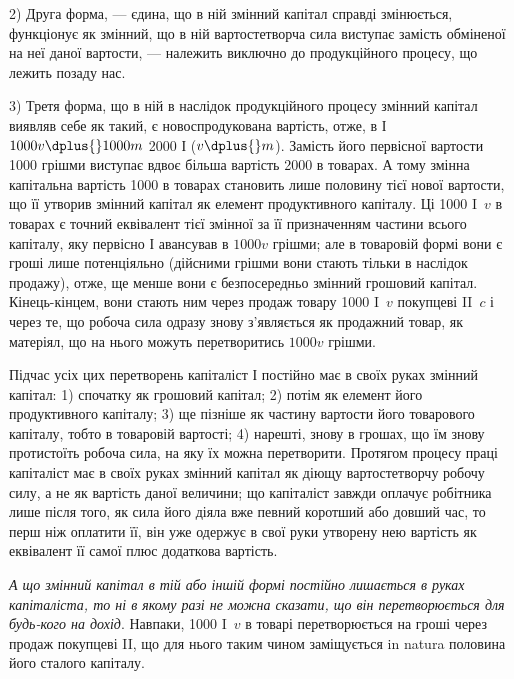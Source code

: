 2) Друга форма, — єдина, що в ній змінний капітал справді змінюється,
функціонує як змінний, що в ній вартостетворча сила виступає замість
обміненої на неї даної вартости, — належить виключно до продукційного
процесу, що лежить позаду нас.

3) Третя форма, що в ній в наслідок продукційного процесу змінний
капітал виявляв себе як такий, є новоспродукована вартість, отже,
в І \deq{} $1000 v \dplus{} 1000 m$ \deq{} 2000 І ($v \dplus{} m$). Замість його первісної вартости \deq{}
1000 грішми виступає вдвоє більша вартість \deq{} 2000 в товарах.
А тому змінна капітальна вартість \deq{} 1000 в товарах становить лише
половину тієї нової вартости, що її утворив змінний капітал як елемент
продуктивного капіталу. Ці 1000 I~$v$ в товарах є точний еквівалент тієї
змінної за її призначенням частини всього капіталу, яку первісно І авансував
в $1000v$ грішми; але в товаровій формі вони є гроші лише потенціяльно
(дійсними грішми вони стають тільки в наслідок продажу), отже,
ще менше вони є безпосередньо змінний грошовий капітал. Кінець-кінцем,
вони стають ним через продаж товару 1000 I~$v$ покупцеві II~$c$ і через
те, що робоча сила одразу знову з’являється як продажний товар, як
матеріял, що на нього можуть перетворитись $1000v$ грішми.

Підчас усіх цих перетворень капіталіст І постійно має в своїх руках
змінний капітал: 1) спочатку як грошовий капітал; 2) потім як елемент
його продуктивного капіталу; 3) ще пізніше як частину вартости його
товарового капіталу, тобто в товаровій вартості; 4) нарешті, знову в грошах,
що їм знову протистоїть робоча сила, на яку їх можна перетворити.
Протягом процесу праці капіталіст має в своїх руках змінний капітал як
діющу вартостетворчу робочу силу, а не як вартість даної величини;
що капіталіст завжди оплачує робітника лише після того, як сила його
діяла вже певний коротший або довший час, то перш ніж оплатити її,
він уже одержує в свої руки утворену нею вартість як еквівалент її
самої плюс додаткова вартість.

\emph{А що змінний капітал в тій або іншій формі постійно
лишається в руках капіталіста, то ні в якому
разі не можна сказати, що він перетворюється для будь-кого
на дохід}. Навпаки, 1000 I~$v$ в товарі перетворюється на гроші
через продаж покупцеві II, що для нього таким чином заміщується
in natura половина його сталого капіталу.

